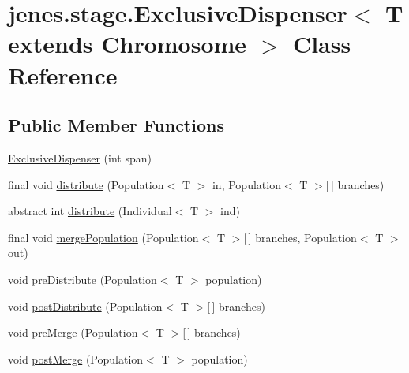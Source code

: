 \hypertarget{classjenes_1_1stage_1_1_exclusive_dispenser_3_01_t_01extends_01_chromosome_01_4}{
\section{jenes.stage.ExclusiveDispenser$<$ T extends Chromosome $>$ Class Reference}
\label{classjenes_1_1stage_1_1_exclusive_dispenser_3_01_t_01extends_01_chromosome_01_4}
}
\subsection*{Public Member Functions}
\begin{CompactItemize}
\item 
\hyperlink{classjenes_1_1stage_1_1_exclusive_dispenser_3_01_t_01extends_01_chromosome_01_4_f8fba035b8567ce8d509fbc7601b4c75}{ExclusiveDispenser} (int span)
\item 
final void \hyperlink{classjenes_1_1stage_1_1_exclusive_dispenser_3_01_t_01extends_01_chromosome_01_4_7ecda0fa0e34e3a31ab2d06cd2b6d593}{distribute} (Population$<$ T $>$ in, Population$<$ T $>$\mbox{[}$\,$\mbox{]} branches)
\item 
abstract int \hyperlink{classjenes_1_1stage_1_1_exclusive_dispenser_3_01_t_01extends_01_chromosome_01_4_706558b075a61b04099decf44729c870}{distribute} (Individual$<$ T $>$ ind)
\item 
final void \hyperlink{classjenes_1_1stage_1_1_exclusive_dispenser_3_01_t_01extends_01_chromosome_01_4_1179e92bbe9a4942b9097d9846c01801}{mergePopulation} (Population$<$ T $>$\mbox{[}$\,$\mbox{]} branches, Population$<$ T $>$ out)
\item 
void \hyperlink{classjenes_1_1stage_1_1_exclusive_dispenser_3_01_t_01extends_01_chromosome_01_4_d5db6c2748cabd6055a33421f601dba4}{preDistribute} (Population$<$ T $>$ population)
\item 
void \hyperlink{classjenes_1_1stage_1_1_exclusive_dispenser_3_01_t_01extends_01_chromosome_01_4_70031ab873b045876e716d0e702d7846}{postDistribute} (Population$<$ T $>$\mbox{[}$\,$\mbox{]} branches)
\item 
void \hyperlink{classjenes_1_1stage_1_1_exclusive_dispenser_3_01_t_01extends_01_chromosome_01_4_e93239ca47669daaeea41d2f8ab6fe51}{preMerge} (Population$<$ T $>$\mbox{[}$\,$\mbox{]} branches)
\item 
void \hyperlink{classjenes_1_1stage_1_1_exclusive_dispenser_3_01_t_01extends_01_chromosome_01_4_67b4ecbb23bc9860e1985a2a573b8823}{postMerge} (Population$<$ T $>$ population)
\end{CompactItemize}


